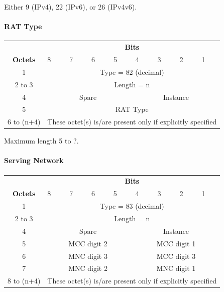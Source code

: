 Either 9 (IPv4), 22 (IPv6), or 26 (IPv4v6).


\paragraph{RAT Type}
\begin{center}
\begin{tabular}{c|p{1cm}|p{1cm}|p{1cm}|p{1cm}|p{1cm}|p{1cm}|p{1cm}|p{1cm}|}
\multicolumn{1}{c}{} & \multicolumn{8}{c}{\textbf{Bits}} \\
\cline{2-9} \textbf{Octets} & 8 & 7 & 6 & 5 & 4 & 3 & 2 & 1 \\ 
\cline{2-9} 1 & \multicolumn{8}{c|}{Type = 82 (decimal)} \\ 
\cline{2-9} 2 to 3 & \multicolumn{8}{c|}{Length = n}  \\ 
\cline{2-9} 4 & \multicolumn{4}{c|}{Spare} & \multicolumn{4}{c|}{Instance} \\ 
\cline{2-9} 5 & \multicolumn{8}{c|}{RAT Type} \\
\cline{2-9} 6 to (n+4) & \multicolumn{8}{c|}{These octet(s) is/are present only if explicitly specified} \\
\cline{2-9}
\end{tabular} 
\end{center}

Maximum length 5 to ?.

\paragraph{Serving Network}

\begin{center}
\begin{tabular}{c|p{1cm}|p{1cm}|p{1cm}|p{1cm}|p{1cm}|p{1cm}|p{1cm}|p{1cm}|}
\multicolumn{1}{c}{} & \multicolumn{8}{c}{\textbf{Bits}} \\
\cline{2-9} \textbf{Octets} & 8 & 7 & 6 & 5 & 4 & 3 & 2 & 1 \\ 
\cline{2-9} 1 & \multicolumn{8}{c|}{Type = 83 (decimal)} \\ 
\cline{2-9} 2 to 3 & \multicolumn{8}{c|}{Length = n}  \\ 
\cline{2-9} 4 & \multicolumn{4}{c|}{Spare} & \multicolumn{4}{c|}{Instance} \\ 
\cline{2-9} 5 & \multicolumn{4}{c|}{MCC digit 2} & \multicolumn{4}{c|}{MCC digit 1} \\ 
\cline{2-9} 6 & \multicolumn{4}{c|}{MNC digit 3} & \multicolumn{4}{c|}{MCC digit 3} \\ 
\cline{2-9} 7 & \multicolumn{4}{c|}{MNC digit 2} & \multicolumn{4}{c|}{MNC digit 1} \\ 
\cline{2-9} 8 to (n+4) & \multicolumn{8}{c|}{These octet(s) is/are present only if explicitly specified} \\
\cline{2-9}
\end{tabular}
\end{center} 

